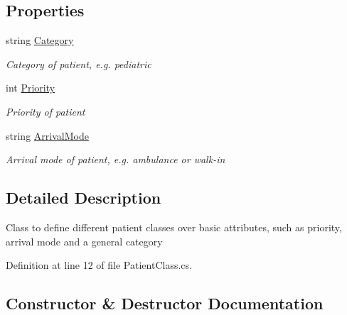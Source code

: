 \subsection*{Properties}
\begin{DoxyCompactItemize}
\item 
string \hyperlink{class_general_health_care_elements_1_1_patient_class_abdf23c862a9e0c7ec75808ae1f285aae}{Category}
\begin{DoxyCompactList}\small\item\em Category of patient, e.\+g. pediatric \end{DoxyCompactList}\item 
int \hyperlink{class_general_health_care_elements_1_1_patient_class_af9e113df6b154c3ea6ebb6c3a380e31f}{Priority}
\begin{DoxyCompactList}\small\item\em Priority of patient \end{DoxyCompactList}\item 
string \hyperlink{class_general_health_care_elements_1_1_patient_class_a0a8a0593a4a5476405605a4c4fb9665b}{Arrival\+Mode}
\begin{DoxyCompactList}\small\item\em Arrival mode of patient, e.\+g. ambulance or walk-\/in \end{DoxyCompactList}\end{DoxyCompactItemize}


\subsection{Detailed Description}
Class to define different patient classes over basic attributes, such as priority, arrival mode and a general category 



Definition at line 12 of file Patient\+Class.\+cs.



\subsection{Constructor \& Destructor Documentation}
